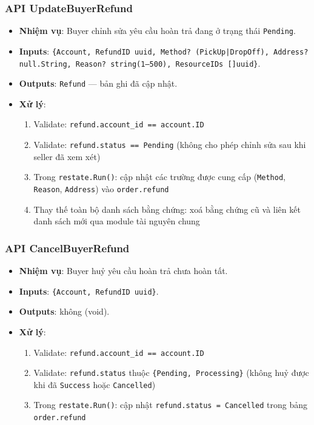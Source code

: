 \subsubsection{API UpdateBuyerRefund}
\label{subsubsec:api-update-buyer-refund}

\begin{itemize}[leftmargin=*]
  \item \textbf{Nhiệm vụ}: Buyer chỉnh sửa yêu cầu hoàn trả đang ở trạng thái \texttt{Pending}.
  \item \textbf{Inputs}: \texttt{\{Account, RefundID uuid, Method? (PickUp|DropOff), Address? null.String, Reason? string(1--500), ResourceIDs []uuid\}}.
  \item \textbf{Outputs}: \texttt{Refund} — bản ghi đã cập nhật.
  \item \textbf{Xử lý}:
    \begin{enumerate}
      \item Validate: \texttt{refund.account\_id == account.ID}
      \item Validate: \texttt{refund.status == Pending} (không cho phép chỉnh sửa sau khi seller đã xem xét)
      \item Trong \texttt{restate.Run()}: cập nhật các trường được cung cấp (\texttt{Method}, \texttt{Reason}, \texttt{Address}) vào \texttt{order.refund}
      \item Thay thế toàn bộ danh sách bằng chứng: xoá bằng chứng cũ và liên kết danh sách mới qua module tài nguyên chung
    \end{enumerate}
\end{itemize}

\subsubsection{API CancelBuyerRefund}
\label{subsubsec:api-cancel-buyer-refund}

\begin{itemize}[leftmargin=*]
  \item \textbf{Nhiệm vụ}: Buyer huỷ yêu cầu hoàn trả chưa hoàn tất.
  \item \textbf{Inputs}: \texttt{\{Account, RefundID uuid\}}.
  \item \textbf{Outputs}: không (void).
  \item \textbf{Xử lý}:
    \begin{enumerate}
      \item Validate: \texttt{refund.account\_id == account.ID}
      \item Validate: \texttt{refund.status} thuộc \texttt{\{Pending, Processing\}} (không huỷ được khi đã \texttt{Success} hoặc \texttt{Cancelled})
      \item Trong \texttt{restate.Run()}: cập nhật \texttt{refund.status = Cancelled} trong bảng \texttt{order.refund}
    \end{enumerate}
\end{itemize}

